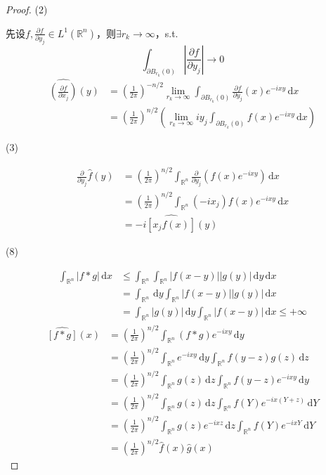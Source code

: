\documentclass[11pt, a4paper]{article}
\theoremstyle{theorem}
\newcommand{\intd}[1]{\,\mathrm{d}{#1}}
\begin{document}
\begin{proof}
(2)

先设$f, \frac{\partial f}{\partial y_j} \in L^1(\mathbb{R}^n)$，则$\exists r_k \rightarrow \infty$，s.t.
$$
\int_{\partial B_{r_k}(0)} \left|\frac{\partial f}{\partial y_j}\right| \rightarrow 0
$$
\begin{align*}
    \widehat{\left(\frac{\partial f}{\partial x_j}\right)}(y)
    &= \left(\frac{1}{2 \pi}\right)^{- n/2} \lim\limits_{r_k \rightarrow \infty} \int_{\partial B_{r_k}(0)} \frac{\partial f}{\partial y_j} (x) e^{-ixy} \intd x \\
    &= \left(\frac{1}{2 \pi}\right)^{n/2} \left(\lim\limits_{r_k \rightarrow \infty} i y_j \int_{\partial B_{r_k}(0)} f(x) e^{-ixy} \intd x\right)
\end{align*}

(3)

\begin{align*}
    \frac{\partial }{\partial y_j} \hat{f}(y) &= \left(\frac{1}{2 \pi}\right)^{n/2} \int_{\mathbb{R}^n} \frac{\partial }{\partial y_j} \left(f(x) e^{-ixy}\right) \intd x  \\
    &= \left(\frac{1}{2 \pi}\right)^{n/2} \int_{\mathbb{R}^n} (-i x_j) f(x) e^{-ixy} \intd x \\
    &= - i \widehat{\left[x_j f(x)\right]}(y)
\end{align*}

(8)

\begin{align*}
    \int_{\mathbb{R}^n} |f * g| \intd x
    &\leq \int_{\mathbb{R}^n} \int_{\mathbb{R}^n} |f(x-y)| |g(y)| \intd y \intd x \\
    &= \int_{\mathbb{R}^n} \intd y \int_{\mathbb{R}^n} |f(x-y)| |g(y)| \intd x \\
    &= \int_{\mathbb{R}^n} |g(y)| \intd y \int_{\mathbb{R}^n} |f(x-y)| \intd x \leq + \infty
\end{align*}
\begin{align*}
    \widehat{[f * g]}(x) &=  \left(\frac{1}{2 \pi}\right)^{n/2} \int_{\mathbb{R}^n} (f * g) e^{-ixy} \intd y \\
    &= \left(\frac{1}{2 \pi}\right)^{n/2} \int_{\mathbb{R}^n} e^{-ixy} \intd y \int_{\mathbb{R}^n} f(y-z) g(z) \intd z \\
    &= \left(\frac{1}{2 \pi}\right)^{n/2} \int_{\mathbb{R}^n} g(z) \intd z \int_{\mathbb{R}^n} f(y-z) e^{-ixy} \intd y \\
    &= \left(\frac{1}{2 \pi}\right)^{n/2} \int_{\mathbb{R}^n} g(z) \intd z \int_{\mathbb{R}^n} f(Y) e^{-ix(Y+z)} \intd Y \\
    &= \left(\frac{1}{2 \pi}\right)^{n/2} \int_{\mathbb{R}^n} g(z)e^{-ixz} \intd z \int_{\mathbb{R}^n} f(Y) e^{-ixY} \intd Y \\
    &= \left(\frac{1}{2 \pi}\right)^{n/2} \hat{f}(x) \hat{g}(x)
\end{align*}
\end{proof}
\end{document}
